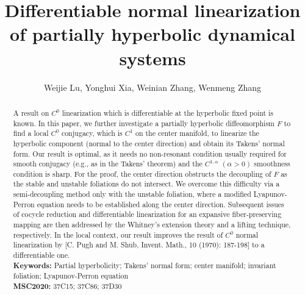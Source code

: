 \documentclass[reqno]{amsart}
\numberwithin{equation}{section}
\begin{document}
\title[Differentiable normal linearization of partially hyperbolic DS]
{Differentiable normal linearization  of
partially
hyperbolic dynamical systems}


\author[ Weijie Lu, Yonghui Xia, Weinian Zhang, Wenmeng Zhang]
{Weijie Lu,  Yonghui Xia, Weinian Zhang, Wenmeng Zhang}  %


\address{Weijie Lu, School of Mathematics  Science, Zhejiang Normal University, Jinhua  321004, China}


\address{Yonghui Xia, School of Mathematics, Foshan University, Foshan 528000, China}

\address{Weinian Zhang,  School of Mathematics, Sichuan University,  Chengdu 610064, China}


\address{Wenmeng Zhang, School of Mathematical Sciences, Chongqing Normal University, Chongqing 401331,  China}


\date{}

\begin{abstract}
A result on $C^0$ linearization which is differentiable at the hyperbolic fixed point is known. 
In this paper, we further investigate a partially hyperbolic diffeomorphism $F$ to find a local $C^0$ conjugacy, which is $C^1$ on the center manifold, to linearize the hyperbolic component (normal to the center direction) and obtain its Takens' normal form. Our result is optimal, as it needs no non-resonant condition usually required for smooth conjugacy (e.g., as in the Takens' theorem) and the $C^{1,\alpha}$ $(\alpha>0)$ smoothness condition is sharp. For the proof, the center direction obstructs the decoupling of $F$ as the stable and unstable foliations do not intersect. We overcome this difficulty via a semi-decoupling method only with the unstable foliation, where a modified Lyapunov-Perron equation needs to be established along the center direction. Subsequent issues of cocycle reduction and differentiable linearization for an expansive fiber-preserving mapping are then addressed by the Whitney's extension theory and a lifting technique, respectively.
In the local context, our result improves the result of $C^0$ normal linearization by [C. Pugh and M. Shub, Invent. Math., 10 (1970): 187-198] to a differentiable one.
\\
{\bf Keywords:}   Partial hyperbolicity; Takens' normal form;  center manifold; invariant foliation; Lyapunov-Perron equation \\
{\bf  MSC2020:}   37C15; 37C86; 37D30
\end{abstract}
\end{document}
